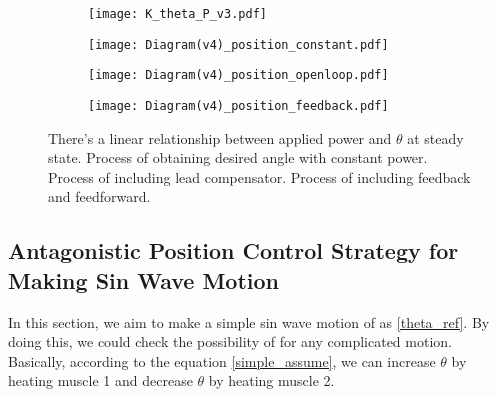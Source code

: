 \begin{figure}[b]
	\centering
	\begin{minipage}{0.35\textwidth}
		\begin{subfigure}{\linewidth}
			\centering
			\texttt{[image: K\_theta\_P\_v3.pdf]}
			\caption{\label{KthetaP}}
		\end{subfigure}
	\end{minipage}%
	\begin{minipage}{0.6\textwidth}
		\begin{subfigure}{\linewidth}
			\texttt{[image: Diagram(v4)\_position\_constant.pdf]}
			\caption{\label{AntaControl_constant}}
		\end{subfigure}
		
		\begin{subfigure}{\linewidth}
			\texttt{[image: Diagram(v4)\_position\_openloop.pdf]}
			\caption{\label{position_open_loop}}
		\end{subfigure}
		
		\begin{subfigure}{\linewidth}
			\texttt{[image: Diagram(v4)\_position\_feedback.pdf]}
			\caption{\label{position_closed_loop}}
		\end{subfigure}
	\end{minipage}
	\caption[Block diagrams for \apc]{ There's a linear relationship between applied power and $\theta$ at steady state.  Process of obtaining desired angle with constant power.  Process of \apc including lead compensator.  Process of \apc including feedback and feedforward.}
	\label{anta_position_diagrams}
\end{figure}


\subsection{Antagonistic Position Control Strategy for Making Sin Wave Motion}
In this section, we aim to make a simple sin wave motion of \anta as \eqref{theta_ref}. By doing this, we could check the possibility of \apc for any complicated motion. Basically, according to the equation \eqref{simple_assume}, we can increase $\theta$ by heating muscle 1 and decrease $\theta$ by heating muscle 2. 

